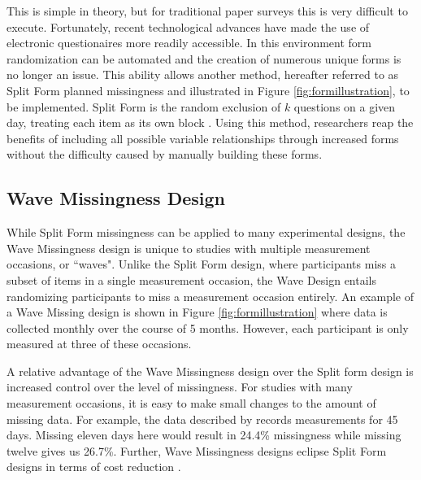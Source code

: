 \documentclass{svjour3}\usepackage[]{graphicx}\usepackage[]{color}
\begin{document}
This is simple in theory, but for traditional paper surveys this is very difficult to execute. Fortunately, recent technological advances have made the use of electronic questionaires more readily accessible. In this environment form randomization can be automated and the creation of numerous unique forms is no longer an issue. This ability allows another method, hereafter referred to as Split Form planned missingness and illustrated in Figure \ref{fig:formillustration}, to be implemented. Split Form is the random exclusion of $k$ questions on a given day, treating each item as its own block \citep{silvia2014planned}.  Using this method, researchers reap the benefits of including all possible variable relationships through increased forms without the difficulty caused by manually building these forms. \par

\subsection{Wave Missingness Design}
\label{sec:1.2}
While Split Form missingness can be applied to many experimental designs, the Wave Missingness design \citep{little2013planned} is unique to studies with multiple measurement occasions, or ``waves". Unlike the Split Form design, where participants miss a subset of items in a single measurement occasion, the Wave Design entails randomizing participants to miss a measurement occasion entirely. An example of a Wave Missing design is shown in Figure \ref{fig:formillustration} where data is collected monthly over the course of 5 months. However, each participant is only measured at three of these occasions. \par

A relative advantage of the Wave Missingness design over the Split form design is increased control over the level of missingness. For studies with many measurement occasions, it is easy to make small changes to the amount of missing data. For example, the data described by \citet{pellowski2016alcohol} records measurements for 45 days. Missing eleven days here would result in 24.4\% missingness while missing twelve gives us 26.7\%. Further, Wave Missingness designs eclipse Split Form designs in terms of cost reduction \citep{little2013planned}. \par
\end{document}
